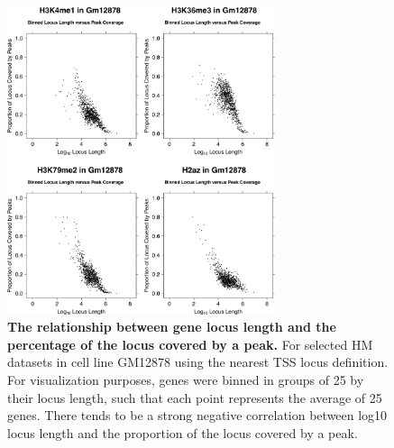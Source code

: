 \newpage

\begin{figure}[ht!]
\centering
\includegraphics[width=0.7\textwidth]{chap2figs/figure2_3.pdf}
\caption[The relationship between gene locus length and the percentage of the locus covered by a peak.]
{
\textbf{The relationship between gene locus length and the percentage of the locus covered by a peak.} For selected HM datasets in cell line GM12878 using the nearest TSS locus definition. For visualization purposes, genes were binned in groups of 25 by their locus length, such that each point represents the average of 25 genes. There tends to be a strong negative correlation between log10 locus length and the proportion of the locus covered by a peak.
}
\label{chap2:fig:3}
\end{figure}

\newpage

